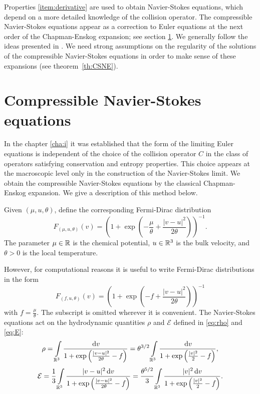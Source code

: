 Properties \eqref{item:derivative} are used to obtain Navier-Stokes equations, which depend on a more detailed knowledge of the collision operator. The compressible Navier-Stokes equations appear as a correction to Euler equations at the next order of the Chapman-Enskog expansion; see section \ref{section:CSNE}. We generally follow the ideas presented in \cite{Bardos1991Fluid}. We need strong assumptions on the regularity of the solutions of the compressible Navier-Stokes equations in order to make sense of these expansions (see theorem~\ref{th:CSNE}).

\section{Compressible Navier-Stokes equations}
  \label{section:CSNE}
In the chapter \ref{cha:i} it was established that the form of the limiting Euler equations is 
independent of the choice of the collision operator $C$ in the class of operators satisfying conservation and entropy properties. This choice appears at the macroscopic level only in the construction of the Navier-Stokes limit. We obtain the compressible Navier-Stokes equations by the classical Chapman-Enskog expansion. We give a description of this method below.

Given $(\mu,u,\theta)$, define the corresponding  Fermi-Dirac distribution
\begin{equation}\label{eq:Fgen}
F_{(\mu,u,\theta)}(v) =
\left(1+\exp\left(-\frac{\mu}{\theta}+\frac{|v-u|^2}{2\theta}\right)\right)^{
-1}.\end{equation} %
The parameter $\mu\in{\mathbb {R}}$ is the chemical potential, $u\in{\mathbb {R}^3}$ is the bulk velocity, and $\theta>0$ is the local temperature.

However, for computational reasons it is useful to write Fermi-Dirac distributions in the form
\begin{equation}\label{eq:Fgen2}
F_{(f,u,\theta)}(v) =
\left(1+\exp\left(-f+\frac{|v-u|^2}{2\theta}\right)\right)^{
-1}\end{equation}with $f= \frac{\mu}{\theta}$.
The subscript is omitted wherever it is convenient.
The Navier-Stokes equations act on the hydrodynamic quantities $\rho$ and $\mathcal E$ defined in \eqref{eq:rho} and \eqref{eq:E}:
\begin{equation*}%
\rho = \int\limits_{\mathbb R^3} \frac{\dv}{1+\exp\left(\frac{|v-u|^2}{2\theta}-f\right)} =  \theta^{3/2}\int\limits_{\mathbb R^3} \frac{\dv}{1+\exp\left(\frac{|v|^2}{2}-f\right)}, \end{equation*}
\begin{equation*}%
\mathcal E = \frac 13\int\limits_{\mathbb R^3} \frac{|v-u|^2\dv}{1+\exp\left(\frac{|v-u|^2}{2\theta}-f\right)} = \frac {\theta^{5/2}}{3}\int\limits_{\mathbb R^3} \frac{|v |^2\dv}{1+\exp\left(\frac{|v |^2}{2 }-f\right)}.
\end{equation*}

